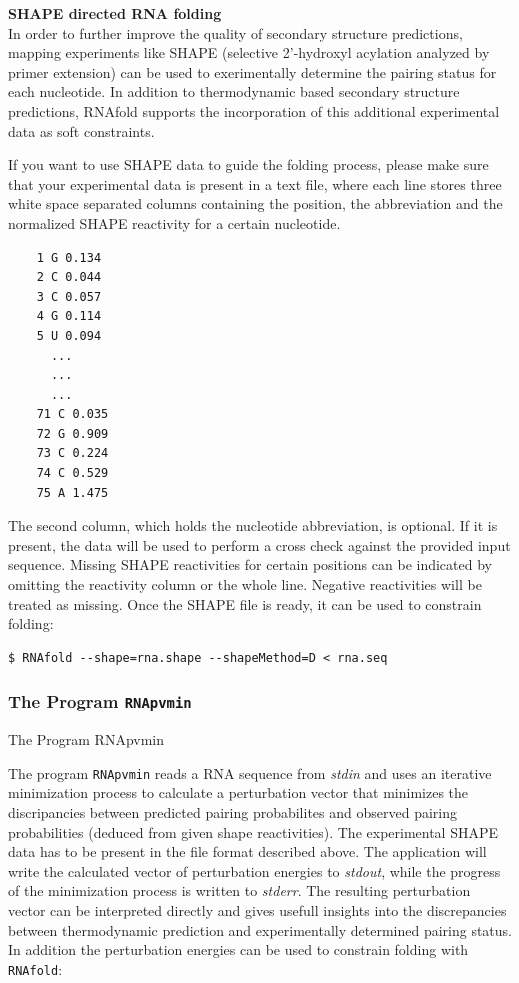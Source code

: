\documentclass[]{article}
\begin{document}
\textbf{SHAPE directed RNA folding}\\
In order to further improve the quality of secondary structure
predictions, mapping experiments like SHAPE (selective 2'-hydroxyl
acylation analyzed by primer extension) can be used to exerimentally
determine the pairing status for each nucleotide. In addition to
thermodynamic based secondary structure predictions, RNAfold supports
the incorporation of this additional experimental data as soft
constraints.

If you want to use SHAPE data to guide the folding process, please make
sure that your experimental data is present in a text file, where each
line stores three white space separated columns containing the position,
the abbreviation and the normalized SHAPE reactivity for a certain
nucleotide.

\begin{verbatim}
    1 G 0.134
    2 C 0.044
    3 C 0.057
    4 G 0.114
    5 U 0.094
      ...
      ...
      ...
    71 C 0.035
    72 G 0.909
    73 C 0.224
    74 C 0.529
    75 A 1.475
\end{verbatim}

The second column, which holds the nucleotide abbreviation, is optional.
If it is present, the data will be used to perform a cross check against
the provided input sequence. Missing SHAPE reactivities for certain
positions can be indicated by omitting the reactivity column or the
whole line. Negative reactivities will be treated as missing. Once the
SHAPE file is ready, it can be used to constrain folding:

\begin{verbatim}
$ RNAfold --shape=rna.shape --shapeMethod=D < rna.seq
\end{verbatim}

\subsubsection{The Program \texttt{RNApvmin}}{The Program RNApvmin}\label{the-program-rnapvmin}

The program \texttt{RNApvmin} reads a RNA sequence from \emph{stdin} and
uses an iterative minimization process to calculate a perturbation
vector that minimizes the discripancies between predicted pairing
probabilites and observed pairing probabilities (deduced from given
shape reactivities). The experimental SHAPE data has to be present in
the file format described above. The application will write the
calculated vector of perturbation energies to \emph{stdout}, while the
progress of the minimization process is written to \emph{stderr}. The
resulting perturbation vector can be interpreted directly and gives
usefull insights into the discrepancies between thermodynamic prediction
and experimentally determined pairing status. In addition the
perturbation energies can be used to constrain folding with
\texttt{RNAfold}:
\end{document}
